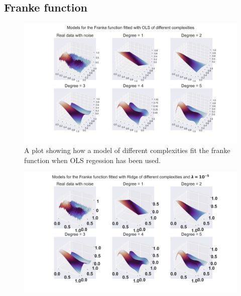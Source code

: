 \subsection{Franke function}
\begin{figure}[H]
	\centering
	\includegraphics[width=\linewidth]{images/Figure_2.png}
	\caption{A plot showing how a model of different complexities fit the franke function when OLS regession has been used.}
	\label{OLS figure}
\end{figure}
%
\begin{figure}[H]
	\centering
	\includegraphics[width=\linewidth]{images/Figure_6.png}
	\caption{}
	\label{Ridge figure}
\end{figure}

